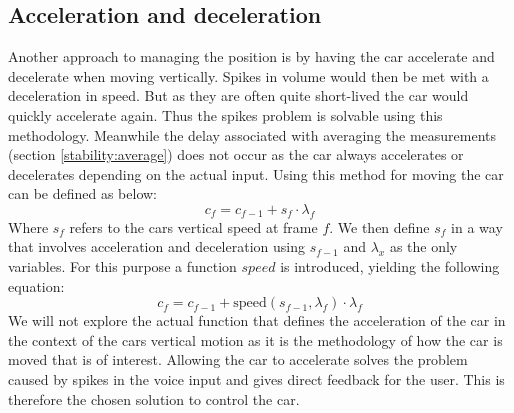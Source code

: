 \subsection{Acceleration and deceleration}\label{stability:acceleration}
Another approach to managing the position is by having the car accelerate and decelerate when moving vertically.
Spikes in volume would then be met with a deceleration in speed.
But as they are often quite short-lived the car would quickly accelerate again.
Thus the spikes problem is solvable using this methodology.
Meanwhile the delay associated with averaging the measurements (section \ref{stability:average}) does not occur as the car always accelerates or decelerates depending on the actual input.
Using this method for moving the car can be defined as below:
$$c_f = c_{f-1} + s_f \cdot \lambda_f$$
Where $s_f$ refers to the cars vertical speed at frame $f$.
We then 	define $s_f$ in a way that involves acceleration and deceleration using $s_{f-1}$ and $\lambda_x$ as the only variables.
For this purpose a function $speed$ is introduced, yielding the following equation:
$$c_f = c_{f-1} + \text{speed}(s_{f-1}, \lambda_f) \cdot \lambda_f$$
We will not explore the actual function that defines the acceleration of the car in the context of the cars vertical motion as it is the methodology of how the car is moved that is of interest.
Allowing the car to accelerate solves the problem caused by spikes in the voice input and gives direct feedback for the user.
This is therefore the chosen solution to control the car.
